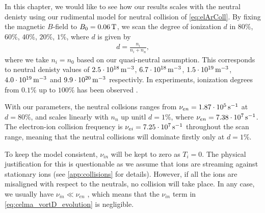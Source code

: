 In this chapter, we would like to see how our results scales with the neutral denisty using our rudimental model for neutral collision of \cref{eq:elArColl}.
By fixing the magnetic $B$-field to $B_0=0.06\, \text{T}$, we scan the degree of ionization $d$ in $80\%$, $60\%$, $40\%$, $20\%$, $1\%$, where $d$ is given by
%
\begin{align*}
    d = \frac{n_i}{n_i+n_n},
\end{align*}
%
where we take $n_i=n_0$ based on our quasi-neutral assumption.
This corresponds to neutral denisty values of
$2.5\cdot10^{18}\, \text{m}^{-3}$,
$6.7\cdot10^{18}\, \text{m}^{-3}$,
$1.5\cdot10^{19}\, \text{m}^{-3}$,
$4.0\cdot10^{19}\, \text{m}^{-3}$ and
$9.9\cdot10^{20}\, \text{m}^{-3}$
respectivly.
In experiments, ionization degrees from $0.1\%$ up to $100\%$ has been observed \cite{Schroder2003Phd}.

With our parameters, the neutral collsions ranges from $\nu_{en}=1.87\cdot10^{5}\, \text{s}^{-1}$ at $d=80\%$, and scales linearly with $n_n$ up unitl $d=1\%$, where $\nu_{en}=7.38\cdot10^7\, \text{s}^{-1}$.
The electron-ion collision frequency is $\nu_{ei}=7.25\cdot10^7 \, \text{s}^{-1}$ throughout the scan range, meaning that the neutral collisions will dominate firstly only at $d=1\%$.

To keep the model consistent, $\nu_{in}$ will be kept to zero as $T_i=0$.
The physical justification for this is questionable as we assume that ions are streaming against stationary ions (see \cref{app:collisions} for details).
However, if all the ions are misaligned with respect to the neutrals, no collision will take place.
In any case, we usually have $\nu_{in}\ll\nu_{en}$ \cite{Schroder2003Phd}, which means that the $\nu_{in}$ term in \cref{eq:celma_vortD_evolution} is negligible.

